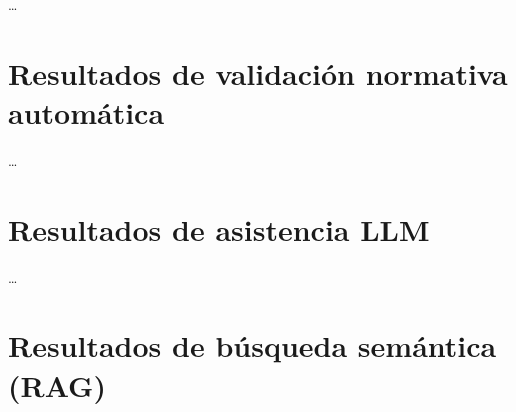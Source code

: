 \ldots

\section{Resultados de validación normativa automática}
\label{sec:resultados_validacion}

\ldots

\section{Resultados de asistencia LLM}
\label{sec:resultados_llm}

\ldots

\section{Resultados de búsqueda semántica (RAG)}
\label{sec:resultados_busqueda}

